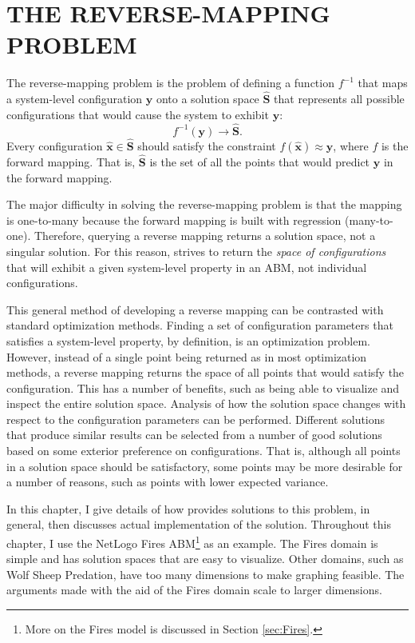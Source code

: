 \chapter{THE REVERSE-MAPPING PROBLEM}
\thispagestyle{plain}

\label{ReverseMapping}

The reverse-mapping problem is the problem of defining a function $f^{-1}$ that maps a system-level configuration $\mathbf y$ onto a solution space $\hat{\mathbf S}$ that represents all possible configurations that would cause the system to exhibit $\mathbf y$:
   \[ f^{-1}(\mathbf y) \rightarrow \hat{\mathbf S}. \]
Every configuration $\hat {\mathbf x} \in \hat {\mathbf S}$ should satisfy the constraint $f(\hat{\mathbf x}) \approx \mathbf y$, where $f$ is the forward mapping.
That is, $\hat{\mathbf S}$ is the set of all the points that would predict $\mathbf y$ in the forward mapping.

The major difficulty in solving the reverse-mapping problem is that the mapping is one-to-many because the forward mapping is built with regression (many-to-one).
Therefore, querying a reverse mapping returns a solution space, not a singular solution.
For this reason, \fw strives to return the \textit{space of configurations} that will exhibit a given system-level property in an ABM, not individual configurations.

This general method of developing a reverse mapping can be contrasted with standard optimization methods.
Finding a set of configuration parameters that satisfies a system-level property, by definition, is an optimization problem.
However, instead of a single point being returned as in most optimization methods, a reverse mapping returns the space of all points that would satisfy the configuration.
This has a number of benefits, such as being able to visualize and inspect the entire solution space.
Analysis of how the solution space changes with respect to the configuration parameters can be performed.
Different solutions that produce similar results can be selected from a number of good solutions based on some exterior preference on configurations.
That is, although all points in a solution space should be satisfactory, some points may be more desirable for a number of reasons, such as points with lower expected variance.

In this chapter, I give details of how \fw provides solutions to this problem, in general, then discusses actual implementation of the solution.
Throughout this chapter, I use the NetLogo Fires ABM\footnote{More on the Fires model is discussed in Section \ref{sec:Fires}.} as an example.
The Fires domain is simple and has solution spaces that are easy to visualize.
Other domains, such as Wolf Sheep Predation, have too many dimensions to make graphing feasible.
The arguments made with the aid of the Fires domain scale to larger dimensions.



